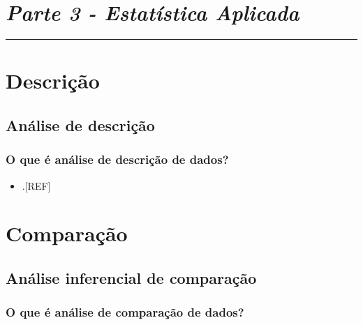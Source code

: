 \documentclass[
  a4paper,
]{book}
\providecommand{\tightlist}{%
  \setlength{\itemsep}{0pt}\setlength{\parskip}{0pt}}
\begin{document}

\hypertarget{parte-3---estatuxedstica-aplicada}{%
\chapter*{\texorpdfstring{\emph{Parte 3 - Estatística Aplicada}}{Parte 3 - Estatística Aplicada}}\label{parte-3---estatuxedstica-aplicada}}

\markboth{}{}
\par\noindent\rule{\textwidth}{0.05in}

\hypertarget{analise-descricao}{%
\chapter{\texorpdfstring{\textbf{Descrição}}{Descrição}}\label{analise-descricao}}

\hypertarget{analise-descricao}{%
\section{Análise de descrição}\label{analise-descricao}}

\hypertarget{o-que-uxe9-anuxe1lise-de-descriuxe7uxe3o-de-dados}{%
\subsection{O que é análise de descrição de dados?}\label{o-que-uxe9-anuxe1lise-de-descriuxe7uxe3o-de-dados}}

\begin{itemize}
\tightlist
\item
  .{[}REF{]}
\end{itemize}

\hypertarget{analise-comparacao}{%
\chapter{\texorpdfstring{\textbf{Comparação}}{Comparação}}\label{analise-comparacao}}

\hypertarget{analise-inferencial-comparacao}{%
\section{Análise inferencial de comparação}\label{analise-inferencial-comparacao}}

\hypertarget{o-que-uxe9-anuxe1lise-de-comparauxe7uxe3o-de-dados}{%
\subsection{O que é análise de comparação de dados?}\label{o-que-uxe9-anuxe1lise-de-comparauxe7uxe3o-de-dados}}
\end{document}
